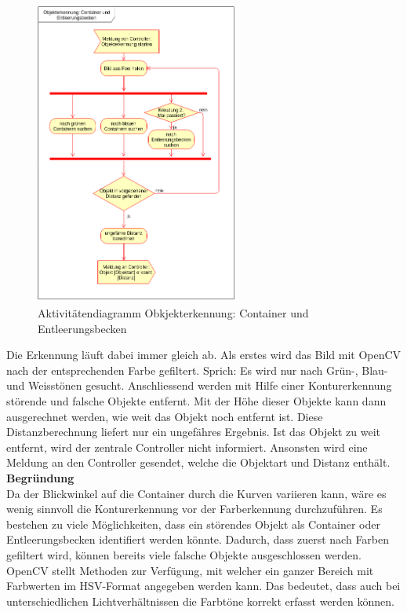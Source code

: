 \begin{figure}[H]%
\centering
\includegraphics[width=0.6\textwidth]{03_Loesungskonzept/pictures/objekterkennung_containers.png}
\caption{Aktivitätendiagramm Obkjekterkennung: Container und Entleerungsbecken}
\label{fig:activityContainer}
\end{figure}
Die Erkennung läuft dabei immer gleich ab. Als erstes wird das Bild mit OpenCV nach der entsprechenden Farbe gefiltert. Sprich: Es wird nur nach Grün-, Blau- und Weisstönen gesucht. Anschliessend werden mit Hilfe einer Konturerkennung störende und falsche Objekte entfernt. Mit der Höhe dieser Objekte kann dann ausgerechnet werden, wie weit das Objekt  noch entfernt ist. Diese Distanzberechnung liefert nur ein ungefähres Ergebnis. Ist das Objekt zu weit entfernt, wird der zentrale Controller nicht informiert. Ansonsten wird eine Meldung an den Controller gesendet, welche die Objektart und Distanz enthält.
\\[0.2cm]
\textbf{Begründung}\\[0.2cm]
Da der Blickwinkel auf die Container durch die Kurven variieren kann, wäre es wenig sinnvoll die Konturerkennung vor der Farberkennung durchzuführen. Es bestehen zu viele Möglichkeiten, dass ein störendes Objekt als Container oder Entleerungsbecken identifiert werden könnte. Dadurch, dass zuerst nach Farben gefiltert wird, können bereits viele falsche Objekte ausgeschlossen werden. \\
OpenCV stellt Methoden zur Verfügung, mit welcher ein ganzer Bereich mit Farbwerten im HSV-Format angegeben werden kann. Das bedeutet, dass auch bei unterschiedlichen Lichtverhältnissen die Farbtöne korrekt erfasst werden können.
